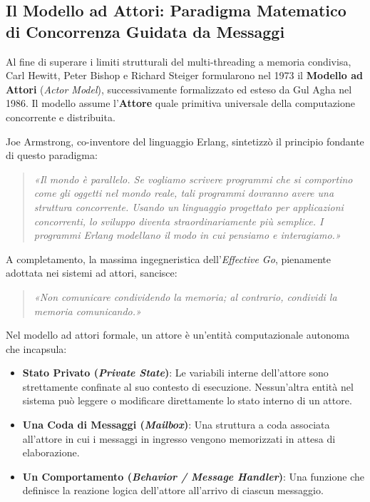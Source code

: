 \subsection{Il Modello ad Attori: Paradigma Matematico di Concorrenza Guidata da Messaggi}
Al fine di superare i limiti strutturali del multi-threading a memoria condivisa, Carl Hewitt, Peter Bishop e Richard Steiger formularono nel 1973 il \textbf{Modello ad Attori} (\textit{Actor Model}), successivamente formalizzato ed esteso da Gul Agha nel 1986. Il modello assume l'\textbf{Attore} quale primitiva universale della computazione concorrente e distribuita.

Joe Armstrong, co-inventore del linguaggio Erlang, sintetizzò il principio fondante di questo paradigma:
\begin{quote}
\textit{«Il mondo è parallelo. Se vogliamo scrivere programmi che si comportino come gli oggetti nel mondo reale, tali programmi dovranno avere una struttura concorrente. Usando un linguaggio progettato per applicazioni concorrenti, lo sviluppo diventa straordinariamente più semplice. I programmi Erlang modellano il modo in cui pensiamo e interagiamo.»}
\end{quote}
A completamento, la massima ingegneristica dell'\textit{Effective Go}, pienamente adottata nei sistemi ad attori, sancisce:
\begin{quote}
\textit{«Non comunicare condividendo la memoria; al contrario, condividi la memoria comunicando.»}
\end{quote}

Nel modello ad attori formale, un attore è un'entità computazionale autonoma che incapsula:
\begin{itemize}
    \item \textbf{Stato Privato (\textit{Private State})}: Le variabili interne dell'attore sono strettamente confinate al suo contesto di esecuzione. Nessun'altra entità nel sistema può leggere o modificare direttamente lo stato interno di un attore.
    \item \textbf{Una Coda di Messaggi (\textit{Mailbox})}: Una struttura a coda associata all'attore in cui i messaggi in ingresso vengono memorizzati in attesa di elaborazione.
    \item \textbf{Un Comportamento (\textit{Behavior / Message Handler})}: Una funzione che definisce la reazione logica dell'attore all'arrivo di ciascun messaggio.
\end{itemize}

